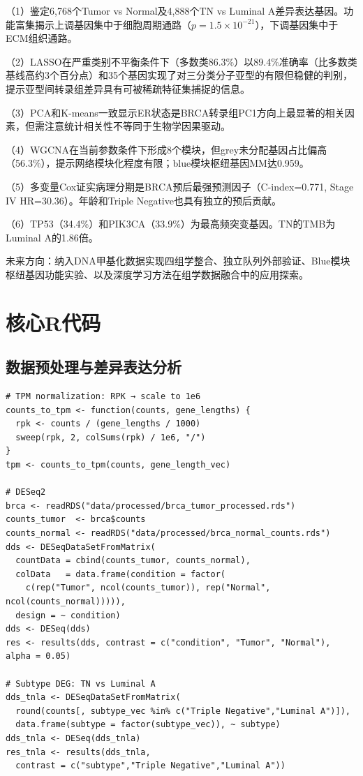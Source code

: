 \documentclass[12pt,a4paper,openany]{ctexbook}
\begin{document}
（1）鉴定6,768个Tumor vs Normal及4,888个TN vs Luminal A差异表达基因。功能富集揭示上调基因集中于细胞周期通路（$p=1.5\times10^{-21}$），下调基因集中于ECM组织通路。

（2）LASSO在严重类别不平衡条件下（多数类86.3\%）以89.4\%准确率（比多数类基线高约3个百分点）和35个基因实现了对三分类分子亚型的有限但稳健的判别，提示亚型间转录组差异具有可被稀疏特征集捕捉的信息。

（3）PCA和K-means一致显示ER状态是BRCA转录组PC1方向上最显著的相关因素，但需注意统计相关性不等同于生物学因果驱动。

（4）WGCNA在当前参数条件下形成8个模块，但grey未分配基因占比偏高（56.3\%），提示网络模块化程度有限；blue模块枢纽基因MM达0.959。

（5）多变量Cox证实病理分期是BRCA预后最强预测因子（C-index=0.771, Stage IV HR=30.36）。年龄和Triple Negative也具有独立的预后贡献。

（6）TP53（34.4\%）和PIK3CA（33.9\%）为最高频突变基因。TN的TMB为Luminal A的1.86倍。

未来方向：纳入DNA甲基化数据实现四组学整合、独立队列外部验证、Blue模块枢纽基因功能实验、以及深度学习方法在组学数据融合中的应用探索。

\printbibliography

\newpage
\appendix
\chapter{核心R代码}

\section{数据预处理与差异表达分析}
\begin{lstlisting}[caption={mRNA预处理与DESeq2差异表达}, basicstyle=\ttfamily\scriptsize]
# TPM normalization: RPK → scale to 1e6
counts_to_tpm <- function(counts, gene_lengths) {
  rpk <- counts / (gene_lengths / 1000)
  sweep(rpk, 2, colSums(rpk) / 1e6, "/")
}
tpm <- counts_to_tpm(counts, gene_length_vec)

# DESeq2
brca <- readRDS("data/processed/brca_tumor_processed.rds")
counts_tumor  <- brca$counts
counts_normal <- readRDS("data/processed/brca_normal_counts.rds")
dds <- DESeqDataSetFromMatrix(
  countData = cbind(counts_tumor, counts_normal),
  colData   = data.frame(condition = factor(
    c(rep("Tumor", ncol(counts_tumor)), rep("Normal", ncol(counts_normal))))),
  design = ~ condition)
dds <- DESeq(dds)
res <- results(dds, contrast = c("condition", "Tumor", "Normal"), alpha = 0.05)

# Subtype DEG: TN vs Luminal A
dds_tnla <- DESeqDataSetFromMatrix(
  round(counts[, subtype_vec %in% c("Triple Negative","Luminal A")]),
  data.frame(subtype = factor(subtype_vec)), ~ subtype)
dds_tnla <- DESeq(dds_tnla)
res_tnla <- results(dds_tnla,
  contrast = c("subtype","Triple Negative","Luminal A"))
\end{lstlisting}
\end{document}
